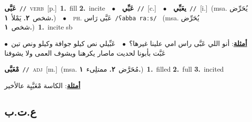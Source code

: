\documentclass[10pt,a4paper,twoside]{article} %
\begin{document}
\begin{multicols}{2}
{\setlength\topsep{0pt}\textbf{\foreignlanguage{arabic}{عَبَّى}}\ {\color{gray}\texttt{//}\color{black}}\ \textsc{verb}\ [p.]\ \textbf{1.}~fill  \textbf{2.}~incite\ \ $\bullet$\ \ \setlength\topsep{0pt}\textbf{\foreignlanguage{arabic}{عَبِّي}}\ {\color{gray}\texttt{//}\color{black}}\ [c.]\ \ $\bullet$\ \ \setlength\topsep{0pt}\textbf{\foreignlanguage{arabic}{يعَبِّي}}\ {\color{gray}\texttt{//}\color{black}}\ [i.]\ \color{gray}(msa. \foreignlanguage{arabic}{يُحَرِّض شخص}~\foreignlanguage{arabic}{\textbf{٢.}}  \foreignlanguage{arabic}{يَمْلأ}~\foreignlanguage{arabic}{\textbf{١.}})\color{black}\ \ $\bullet$\ \ \textsc{ph.} \color{gray} \foreignlanguage{arabic}{عَبَّى رَاس}\color{black}\ {\color{gray}\texttt{/{\sffamily ʕabba raːs}/}\color{black}}\ \color{gray} (msa. \foreignlanguage{arabic}{يُحَرِّض شخص}~\foreignlanguage{arabic}{\textbf{١.}})\color{black}\ \textbf{1.}~incite sb\  \begin{flushright}\color{gray}\foreignlanguage{arabic}{\textbf{\underline{\foreignlanguage{arabic}{أمثلة}}}: أنو اللي عَبَّى راس امي علينا غيرها؟\ $\bullet$\ \  عَبِّيلي نص كيلو جوافة وكيلو ونص تين\ $\bullet$\ \  عَبَّت بأبونا لحديت ماصار يكرهنا ويشوف العمى ولا يشوفنا}\end{flushright}\color{black}} \vspace{2mm}

{\setlength\topsep{0pt}\textbf{\foreignlanguage{arabic}{مْعَبَّى}}\ {\color{gray}\texttt{//}\color{black}}\ \textsc{adj}\ [m.]\ \color{gray}(msa. \foreignlanguage{arabic}{مُحَرَّض}~\foreignlanguage{arabic}{\textbf{٢.}}  \foreignlanguage{arabic}{ممتلِىء}~\foreignlanguage{arabic}{\textbf{١.}})\color{black}\ \textbf{1.}~filled  \textbf{2.}~full  \textbf{3.}~incited\  \begin{flushright}\color{gray}\foreignlanguage{arabic}{\textbf{\underline{\foreignlanguage{arabic}{أمثلة}}}: الكاسة مْعَبَّيِة عالأخير}\end{flushright}\color{black}} \vspace{2mm}

\vspace{-3mm}
\subsection*{\color{blue}\foreignlanguage{arabic}{ع.ت.ب}\color{blue}{}} 


\end{multicols}
\end{document}

